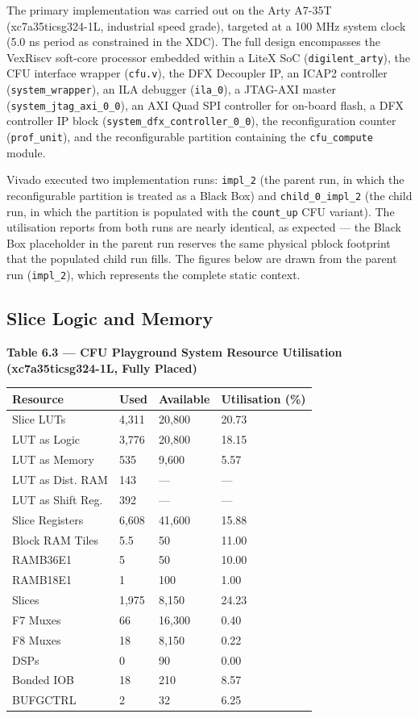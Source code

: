 The primary implementation was carried out on the Arty A7-35T (xc7a35ticsg324-1L, industrial speed grade), targeted at a 100 MHz system clock (5.0 ns period as constrained in the XDC). The full design encompasses the VexRiscv soft-core processor embedded within a LiteX SoC (\texttt{digilent\_arty}), the CFU interface wrapper (\texttt{cfu.v}), the DFX Decoupler IP, an ICAP2 controller (\texttt{system\_wrapper}), an ILA debugger (\texttt{ila\_0}), a JTAG-AXI master (\texttt{system\_jtag\_axi\_0\_0}), an AXI Quad SPI controller for on-board flash, a DFX controller IP block (\texttt{system\_dfx\_controller\_0\_0}), the reconfiguration counter (\texttt{prof\_unit}), and the reconfigurable partition containing the \texttt{cfu\_compute} module.

Vivado executed two implementation runs: \texttt{impl\_2} (the parent run, in which the reconfigurable partition is treated as a Black Box) and \texttt{child\_0\_impl\_2} (the child run, in which the partition is populated with the \texttt{count\_up} CFU variant). The utilisation reports from both runs are nearly identical, as expected — the Black Box placeholder in the parent run reserves the same physical pblock footprint that the populated child run fills. The figures below are drawn from the parent run (\texttt{impl\_2}), which represents the complete static context.

\subsection{Slice Logic and Memory}

\textbf{Table 6.3 — CFU Playground System Resource Utilisation (xc7a35ticsg324-1L, Fully Placed)}

\begin{table}[htbp]
\centering
\begin{tabularx}{\textwidth}{X X X X}
\toprule
Resource & Used & Available & Utilisation (\%) \\
\midrule
Slice LUTs & 4,311 & 20,800 & 20.73 \\
LUT as Logic & 3,776 & 20,800 & 18.15 \\
LUT as Memory & 535 & 9,600 & 5.57 \\
LUT as Dist. RAM & 143 & — & — \\
LUT as Shift Reg. & 392 & — & — \\
Slice Registers & 6,608 & 41,600 & 15.88 \\
Block RAM Tiles & 5.5 & 50 & 11.00 \\
RAMB36E1 & 5 & 50 & 10.00 \\
RAMB18E1 & 1 & 100 & 1.00 \\
Slices & 1,975 & 8,150 & 24.23 \\
F7 Muxes & 66 & 16,300 & 0.40 \\
F8 Muxes & 18 & 8,150 & 0.22 \\
DSPs & 0 & 90 & 0.00 \\
Bonded IOB & 18 & 210 & 8.57 \\
BUFGCTRL & 2 & 32 & 6.25 \\
\bottomrule
\end{tabularx}
\end{table}

